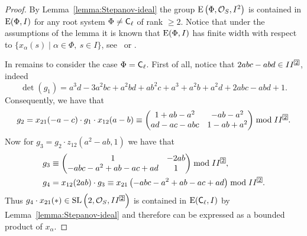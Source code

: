\begin{proof}
By Lemma~\ref{lemma:Stepanov-ideal} the group $\operatorname{E}\left(\Phi,\mathcal{O}_S,I^2\right)$ is contained in $\operatorname{E}(\Phi,I)$ for any root system $\Phi\neq\mathsf{C}_\ell$ of rank $\geqslant2$.
Notice that under the assumptions of the lemma it is known that $\operatorname{E}(\Phi,I)$ has finite width with respect to $\{x_\alpha(s)\mid\alpha\in\Phi,\ s\in I\}$, see~\cite{Tavgen93} or \cite[Theorem~3.3]{TavgenThesis}.

In remains to consider the case $\Phi=\mathsf{C}_\ell$. First of all, notice that $2abc-abd\in II^{\indexbox{2}}$, indeed
\[ \det(g_1)=a^3d-3a^2bc+a^2bd+ab^2c+a^3+a^2b+a^2d+2abc-abd+1. \]
Consequently, we have that
\[ g_2=x_{21}(-a-c)\cdot g_1\cdot x_{12}(a-b)\equiv
\begin{pmatrix}
1+ab-a^2 & -ab-a^2 \\ ad-ac-abc & 1-ab+a^2
\end{pmatrix}\bmod II^{\indexbox{2}}. \]
Now for $g_3=g_2\cdot z_{12}\left(a^2-ab,1\right)$ we have that
\begin{align*}
& g_3\equiv\begin{pmatrix} 1 & -2ab \\ -abc-a^2+ab-ac+ad & 1 \end{pmatrix}\bmod II^{\indexbox{2}},\\
& g_4=x_{12}(2ab)\cdot g_3\equiv x_{21}\left(-abc-a^2+ab-ac+ad\right)\bmod II^{\indexbox{2}}.
\end{align*}
Thus $g_4\cdot x_{21}(*)\in\SL\left(2,\mathcal{O}_S,II^{\indexbox{2}}\right)$ is contained in $\operatorname{E}(\mathsf{C}_\ell,I)$ by Lemma~\ref{lemma:Stepanov-ideal} and therefore can be expressed as a bounded product of $x_\alpha$.
\end{proof}